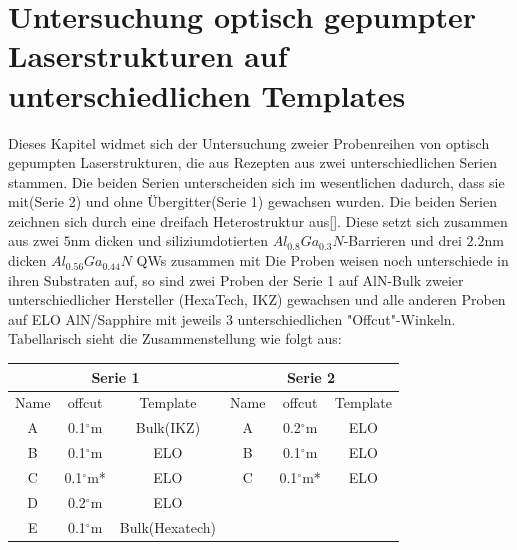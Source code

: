 \thispagestyle{fancy}
\section{Untersuchung optisch gepumpter Laserstrukturen auf unterschiedlichen Templates}
Dieses Kapitel widmet sich der Untersuchung zweier Probenreihen von optisch gepumpten Laserstrukturen, die aus Rezepten aus zwei unterschiedlichen Serien stammen. Die beiden Serien unterscheiden sich im wesentlichen dadurch, dass sie mit(Serie 2) und ohne Übergitter(Serie 1) gewachsen wurden.  Die beiden Serien zeichnen sich durch eine dreifach Heterostruktur aus[]. Diese setzt sich zusammen aus zwei $5$nm dicken und siliziumdotierten $ Al_{0.8}Ga_{0.3}N$-Barrieren und drei $2.2$nm dicken $ Al_{0.56}Ga_{0.44}N$ QWs zusammen mit 
Die Proben weisen noch unterschiede in ihren Substraten auf, so sind zwei Proben der Serie 1 auf AlN-Bulk zweier unterschiedlicher Hersteller (HexaTech, IKZ) gewachsen und alle anderen Proben auf ELO AlN/Sapphire mit jeweils 3 unterschiedlichen "Offcut"-Winkeln. Tabellarisch sieht die Zusammenstellung wie folgt aus: 

\vspace{1cm}


\setlength{\arrayrulewidth}{0.05mm}
\setlength{\tabcolsep}{2.5mm}
\renewcommand{\arraystretch}{1}
 
\centering
\begin{tabular}{ |c|c|c|c|c|c|   }
\hline
\multicolumn{3}{|c|}{Serie 1} & \multicolumn{3}{c|}{Serie 2}  \\
\hline
Name & offcut& Template & Name& offcut & Template \\
\hline
A & 0.1$^\circ$m & Bulk(IKZ) &A & 0.2$^\circ$m & ELO \\
B & 0.1$^\circ$m & ELO & B & 0.1$^\circ$m & ELO \\
C & 0.1$^\circ$m* & ELO & C & 0.1$^\circ$m* & ELO \\
D & 0.2$^\circ$m & ELO &  & &  \\
E & 0.1$^\circ$m & Bulk(Hexatech) & & & \\
\hline
\end{tabular}
\newpage


